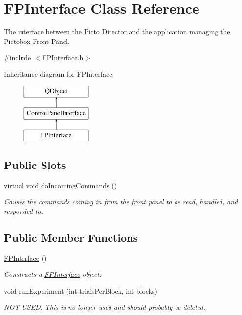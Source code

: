 \hypertarget{class_f_p_interface}{\section{F\-P\-Interface Class Reference}
\label{class_f_p_interface}
}


The interface between the \hyperlink{namespace_picto}{Picto} \hyperlink{class_director}{Director} and the application managing the Pictobox Front Panel.  




{\ttfamily \#include $<$F\-P\-Interface.\-h$>$}

Inheritance diagram for F\-P\-Interface\-:\begin{figure}[H]
\begin{center}
\leavevmode
\includegraphics[height=3.000000cm]{class_f_p_interface}
\end{center}
\end{figure}
\subsection*{Public Slots}
\begin{DoxyCompactItemize}
\item 
virtual void \hyperlink{class_f_p_interface_a1cf315b0168842fe2feb997ed910c08e}{do\-Incoming\-Commands} ()
\begin{DoxyCompactList}\small\item\em Causes the commands coming in from the front panel to be read, handled, and responded to. \end{DoxyCompactList}\end{DoxyCompactItemize}
\subsection*{Public Member Functions}
\begin{DoxyCompactItemize}
\item 
\hyperlink{class_f_p_interface_a649ddbc8475e0abbd519df5676dbe1e1}{F\-P\-Interface} ()
\begin{DoxyCompactList}\small\item\em Constructs a \hyperlink{class_f_p_interface}{F\-P\-Interface} object. \end{DoxyCompactList}\item 
\hypertarget{class_f_p_interface_aa88d34be9018d01baba0ca938f6c70ae}{void \hyperlink{class_f_p_interface_aa88d34be9018d01baba0ca938f6c70ae}{run\-Experiment} (int trials\-Per\-Block, int blocks)}\label{class_f_p_interface_aa88d34be9018d01baba0ca938f6c70ae}

\begin{DoxyCompactList}\small\item\em N\-O\-T U\-S\-E\-D. This is no longer used and should probably be deleted. \end{DoxyCompactList}\end{DoxyCompactItemize}
